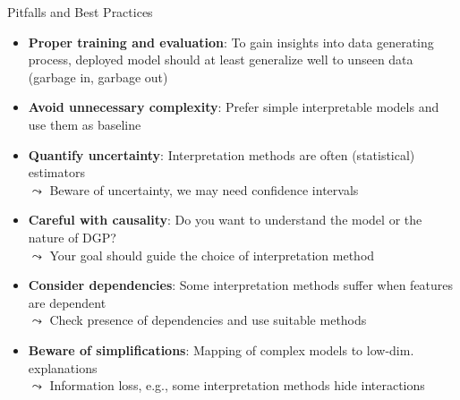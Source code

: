 \documentclass[11pt,compress,t,notes=noshow, aspectratio=169, xcolor=table]{beamer}
\begin{document}
\begin{frame}[t]{Pitfalls and Best Practices }
\begin{itemize}[<+->]
    \item \textbf{Proper training and evaluation}:
    To gain insights into data generating process, deployed model should at least generalize well to unseen data (garbage in, garbage out)
    \item \textbf{Avoid unnecessary complexity}: Prefer simple interpretable models and use them as baseline
    \item \textbf{Quantify uncertainty}: Interpretation methods are often (statistical) estimators \\
    $\leadsto$ Beware of uncertainty, we may need confidence intervals
    \item \textbf{Careful with causality}:
     Do you want to understand the model or the nature of DGP?\\
     $\leadsto$ Your goal should guide the choice of interpretation method
    \item \textbf{Consider dependencies}: Some interpretation methods suffer when features are dependent\\
    $\leadsto$ Check presence of dependencies and use suitable methods
    \item \textbf{Beware of simplifications}:
    Mapping of complex models to low-dim. explanations\\
    $\leadsto$ Information loss, e.g., some interpretation methods hide interactions
\end{itemize}

\end{frame}

\endlecture
\end{document}
